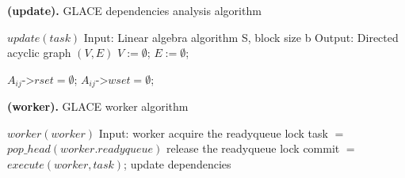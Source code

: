 \documentclass[preprint,11pt]{elsarticle}
\begin{document}
\begin{algorithm}
\caption{{\bf (update).} GLACE dependencies analysis algorithm}
\label{alg:update}
{\footnotesize
\begin{algorithmic} [1]
\STATE $update(task)$
\STATE Input: Linear algebra algorithm S, block size b
\STATE Output: Directed acyclic graph $(V, E)$
\STATE $V :=  \emptyset$; $E := \emptyset$;

      \STATE $A_{ij} \texttt{->} rset = \emptyset$; $A_{ij} \texttt{->} wset = \emptyset$;
    \ENDFOR
  \ENDFOR
\ENDFOR


	    \ENDIF
      \ENDFOR
    \ENDIF
  \ENDFOR

	    \ENDIF
       \ENDFOR
    \ENDIF 
  \ENDFOR

\ENDFOR


\end{algorithmic}
}
\end{algorithm}




\begin{algorithm}
\caption{{\bf (worker).} GLACE worker algorithm}
\label{alg:worker}
{\footnotesize
\begin{algorithmic} [1]
\STATE $worker(worker)$
\STATE Input: worker
  \STATE acquire the readyqueue lock
  \STATE task $=$ $pop\_head(worker.readyqueue)$
  \STATE release the readyqueue lock
    \STATE commit $=$ $execute(worker, task)$;
      \STATE update dependencies
    \ENDIF
  \ENDIF
\ENDWHILE
\end{algorithmic}
}
\end{algorithm}

\end{document}
